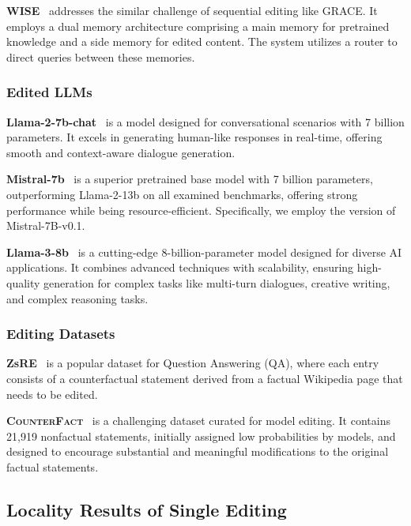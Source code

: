 \noindent \textbf{WISE}~\cite{wang2024wise} addresses the similar challenge of sequential editing like GRACE. It employs a dual memory architecture comprising a main memory for pretrained knowledge and a side memory for edited content. The system utilizes a router to direct queries between these memories. 

\subsubsection{Edited LLMs}



\textbf{Llama-2-7b-chat}~\cite{touvron2023llama2openfoundation} is a model designed for conversational scenarios with 7 billion parameters. 
It excels in generating human-like responses in real-time, offering smooth and context-aware dialogue generation.

\noindent \textbf{Mistral-7b}~\cite{jiang2023mistral7b} is a superior pretrained base model with 7 billion parameters, outperforming Llama-2-13b on all examined benchmarks,  offering strong performance while being resource-efficient.
Specifically, we employ the version of Mistral-7B-v0.1.

\noindent \textbf{Llama-3-8b}~\cite{llama3} is a cutting-edge 8-billion-parameter model designed for diverse AI applications. It combines advanced techniques with scalability, ensuring high-quality generation for complex tasks like multi-turn dialogues, creative writing, and complex reasoning tasks.



\subsubsection{Editing Datasets}
\textbf{ZsRE}~\cite{levy2017zero} is a popular dataset for Question Answering (QA), where each entry consists of a counterfactual statement derived from a factual Wikipedia page that needs to be edited. 

\noindent \textbf{\textsc{CounterFact}}~\cite{meng2023locating} is a challenging dataset curated for model editing. It contains 21,919 nonfactual statements, initially assigned low probabilities by models, and designed to encourage substantial and meaningful modifications to the original factual statements.



\subsection{Locality Results of Single Editing}
\label{apd:loc_single_edit}




